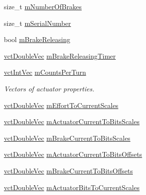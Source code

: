 \begin{DoxyCompactItemize}
size\-\_\-t \hyperlink{classsaw_robot_i_o1394_1_1osa_robot1394_aa946b78c2e09f0ad69a1676d5550dcc3}{m\-Number\-Of\-Brakes}
\item 
size\-\_\-t \hyperlink{classsaw_robot_i_o1394_1_1osa_robot1394_a8c656e427a6d69cf483e48447364c8a1}{m\-Serial\-Number}
\item 
bool \hyperlink{classsaw_robot_i_o1394_1_1osa_robot1394_a054235afa64819d42d7a761bbd840336}{m\-Brake\-Releasing}
\item 
\hyperlink{vct_dynamic_vector_types_8h_ade4b3068c86fb88f41af2e5187e491c2}{vct\-Double\-Vec} \hyperlink{classsaw_robot_i_o1394_1_1osa_robot1394_a9cb2dd0b02583f901ac166b971c3ad7a}{m\-Brake\-Releasing\-Timer}
\item 
\hyperlink{vct_dynamic_vector_types_8h_a47260df0b570a25352b3f318ed0b4c4e}{vct\-Int\-Vec} \hyperlink{classsaw_robot_i_o1394_1_1osa_robot1394_a61cef93b8d7e5118334dc2b18fd4ebe5}{m\-Counts\-Per\-Turn}
\begin{DoxyCompactList}\small\item\em Vectors of actuator properties. \end{DoxyCompactList}\item 
\hyperlink{vct_dynamic_vector_types_8h_ade4b3068c86fb88f41af2e5187e491c2}{vct\-Double\-Vec} \hyperlink{classsaw_robot_i_o1394_1_1osa_robot1394_ad2a0704862573ef828d5bd144ca6e98f}{m\-Effort\-To\-Current\-Scales}
\item 
\hyperlink{vct_dynamic_vector_types_8h_ade4b3068c86fb88f41af2e5187e491c2}{vct\-Double\-Vec} \hyperlink{classsaw_robot_i_o1394_1_1osa_robot1394_ad575ec6aeec11e510ee4cb1c79ae0faf}{m\-Actuator\-Current\-To\-Bits\-Scales}
\item 
\hyperlink{vct_dynamic_vector_types_8h_ade4b3068c86fb88f41af2e5187e491c2}{vct\-Double\-Vec} \hyperlink{classsaw_robot_i_o1394_1_1osa_robot1394_aa827483068b8e3b6073fdd69348bc89f}{m\-Brake\-Current\-To\-Bits\-Scales}
\item 
\hyperlink{vct_dynamic_vector_types_8h_ade4b3068c86fb88f41af2e5187e491c2}{vct\-Double\-Vec} \hyperlink{classsaw_robot_i_o1394_1_1osa_robot1394_a860f7b96fe04821b608daaf462a088e8}{m\-Actuator\-Current\-To\-Bits\-Offsets}
\item 
\hyperlink{vct_dynamic_vector_types_8h_ade4b3068c86fb88f41af2e5187e491c2}{vct\-Double\-Vec} \hyperlink{classsaw_robot_i_o1394_1_1osa_robot1394_a0d6c644ce6ccb25a241f3e1ce2133fbd}{m\-Brake\-Current\-To\-Bits\-Offsets}
\item 
\hyperlink{vct_dynamic_vector_types_8h_ade4b3068c86fb88f41af2e5187e491c2}{vct\-Double\-Vec} \hyperlink{classsaw_robot_i_o1394_1_1osa_robot1394_aac06ad637bc37227e61aadb884a02624}{m\-Actuator\-Bits\-To\-Current\-Scales}

\end{DoxyCompactItemize}
